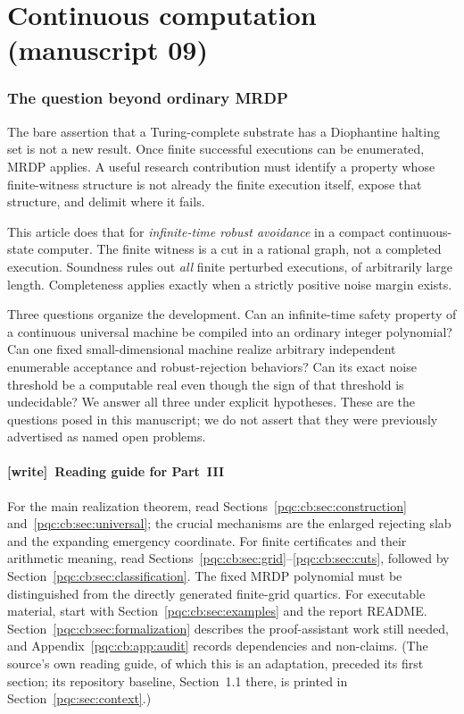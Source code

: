 \documentclass[11pt,letterpaper]{article}
\numberwithin{equation}{section}
\theoremstyle{definition}
\theoremstyle{remark}
\newcommand{\wtag}{\textup{[write]}}
\begin{document}
\part{Continuous computation (manuscript 09)}
\label{pqc:part:continuous}

\section{The question beyond ordinary MRDP}
\label{pqc:cb:sec:intro}

The bare assertion that a Turing-complete substrate has a Diophantine halting
set is not a new result.  Once finite successful executions can be enumerated,
MRDP applies.  A useful research contribution must identify a property whose
finite-witness structure is not already the finite execution itself, expose
that structure, and delimit where it fails.

This article does that for \emph{infinite-time robust avoidance} in a compact
continuous-state computer.  The finite witness is a cut in a rational graph,
not a completed execution.  Soundness rules out \emph{all} finite perturbed
executions, of arbitrarily large length.  Completeness applies exactly when a
strictly positive noise margin exists.

Three questions organize the development.  Can an infinite-time safety
property of a continuous universal machine be compiled into an ordinary
integer polynomial?  Can one fixed small-dimensional machine realize
arbitrary independent enumerable acceptance and robust-rejection behaviors?
Can its exact noise threshold be a computable real even though the sign of
that threshold is undecidable?  We answer all three under explicit hypotheses.
These are the questions posed in this manuscript; we do not assert that they
were previously advertised as named open problems.


\subsection*{\wtag\ Reading guide for Part~III}
For the main realization theorem, read Sections~\ref{pqc:cb:sec:construction}
and~\ref{pqc:cb:sec:universal}; the crucial mechanisms are the enlarged
rejecting slab and the expanding emergency coordinate. For finite
certificates and their arithmetic meaning, read
Sections~\ref{pqc:cb:sec:grid}--\ref{pqc:cb:sec:cuts}, followed by
Section~\ref{pqc:cb:sec:classification}. The fixed MRDP polynomial must be
distinguished from the directly generated finite-grid quartics. For
executable material, start with Section~\ref{pqc:cb:sec:examples} and the
report README. Section~\ref{pqc:cb:sec:formalization} describes the
proof-assistant work still needed, and Appendix~\ref{pqc:cb:app:audit}
records dependencies and non-claims. (The source's own reading guide, of
which this is an adaptation, preceded its first section; its repository
baseline, Section~1.1 there, is printed in Section~\ref{pqc:sec:context}.)
\end{document}
